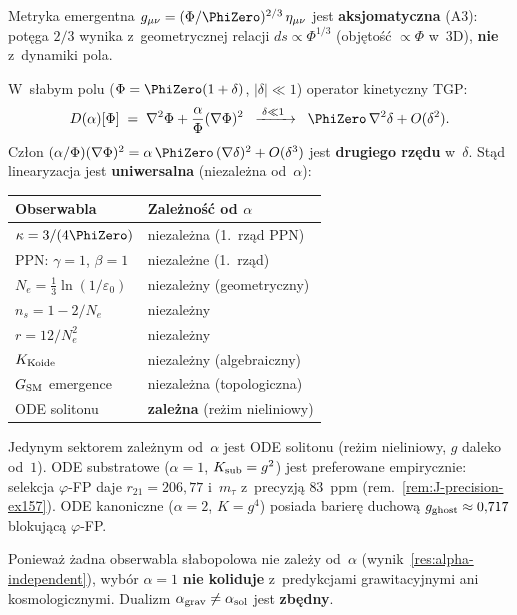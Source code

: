 \begin{result}%
\label{res:alpha-independent}
Metryka emergentna $g_{\mu\nu} = (\Phi/\PhiZero)^{2/3}\,\eta_{\mu\nu}$
jest \textbf{aksjomatyczna} (A3): pot\k{e}ga $2/3$ wynika z~geometrycznej
relacji $ds \propto \Phi^{1/3}$ (obj\k{e}to\'s\'c $\propto \Phi$ w~3D),
\textbf{nie} z~dynamiki pola.

W~s\l{}abym polu ($\Phi = \PhiZero(1 + \delta)$, $|\delta| \ll 1$)
operator kinetyczny TGP:
\begin{equation}\label{eq:D-alpha-linear}
  D(\alpha)[\Phi] \;=\; \nabla^2\Phi + \frac{\alpha}{\Phi}(\nabla\Phi)^2
  \;\;\xrightarrow{\;\delta \ll 1\;\;}\;\;
  \PhiZero\,\nabla^2\delta + O(\delta^2).
\end{equation}
Cz\l{}on $(\alpha/\Phi)(\nabla\Phi)^2 = \alpha\,\PhiZero\,(\nabla\delta)^2
+ O(\delta^3)$ jest \textbf{drugiego rz\k{e}du} w~$\delta$.
St\k{a}d linearyzacja jest \textbf{uniwersalna} (niezale\.zna od~$\alpha$):

\medskip
\begin{center}\small
\begin{tabular}{@{}ll@{}}
\toprule
\textbf{Obserwabla} & \textbf{Zale\.zno\'s\'c od $\alpha$} \\
\midrule
$\kappa = 3/(4\PhiZero)$ & niezale\.zna (1.~rz\k{a}d PPN) \\
PPN: $\gamma = 1$, $\beta = 1$ & niezale\.zne (1.~rz\k{a}d) \\
$N_e = \tfrac{1}{3}\ln(1/\varepsilon_0)$ & niezale\.zny (geometryczny) \\
$n_s = 1 - 2/N_e$ & niezale\.zny \\
$r = 12/N_e^2$ & niezale\.zny \\
$K_{\rm Koide}$ & niezale\.zny (algebraiczny) \\
$G_{\rm SM}$ emergence & niezale\.zna (topologiczna) \\
\midrule
ODE solitonu & \textbf{zale\.zna} (re\.zim nieliniowy) \\
\bottomrule
\end{tabular}
\end{center}
\end{result}

\begin{corollary}[$\alpha = 1$ preferowane bez konfliktu]%
\label{cor:alpha1-preferred}
Jedynym sektorem zale\.znym od~$\alpha$ jest ODE solitonu
(re\.zim nieliniowy, $g$ daleko od~$1$).
ODE substratowe ($\alpha = 1$, $K_{\rm sub} = g^2$) jest preferowane
empirycznie: selekcja $\varphi$-FP daje $r_{21} = 206{,}77$
i~$m_\tau$ z~precyzj\k{a} $83$~ppm (rem.~\ref{rem:J-precision-ex157}).
ODE kanoniczne ($\alpha = 2$, $K = g^4$) posiada barier\k{e}
duchow\k{a} $g_{\rm ghost} \approx 0{,}717$
blokuj\k{a}c\k{a} $\varphi$-FP.

Poniewa\.z \.zadna obserwabla s\l{}abopolowa nie zale\.zy od~$\alpha$
(wynik~\ref{res:alpha-independent}), wyb\'or $\alpha = 1$
\textbf{nie koliduje} z~predykcjami grawitacyjnymi ani kosmologicznymi.
Dualizm $\alpha_{\rm grav} \neq \alpha_{\rm sol}$ jest
\textbf{zb\k{e}dny}.
\end{corollary}

